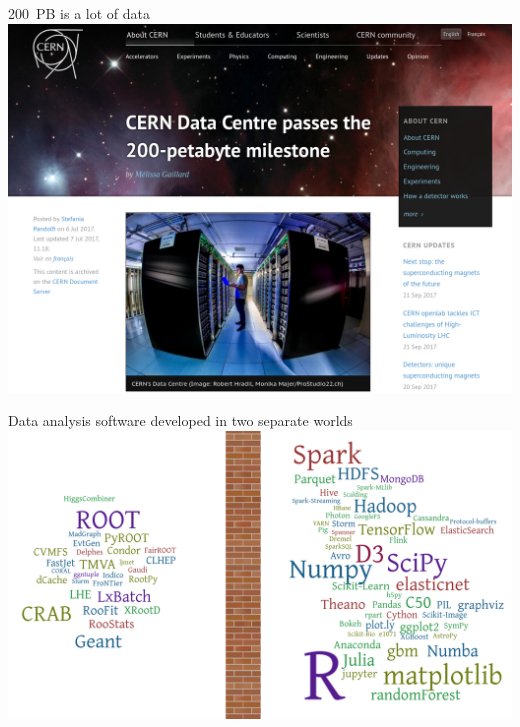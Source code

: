 \documentclass[aspectratio=169]{beamer}
\begin{document}
\begin{frame}{{200~PB is a lot of data}}
\vspace{0.35 cm}
\includegraphics[width=0.73\linewidth]{cern-200pb.png}

\vspace{-4.8 cm}
\end{frame}

\begin{frame}{Data analysis software developed in two separate worlds}
\vspace{0.17 cm}
\includegraphics[width=\linewidth]{separation-2.png}
\end{frame}
\end{document}
